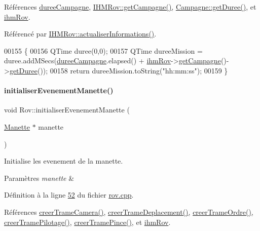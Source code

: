 Références \hyperlink{rov_8h_source_l00109}{duree\+Campagne}, \hyperlink{ihmrov_8cpp_source_l00149}{I\+H\+M\+Rov\+::get\+Campagne()}, \hyperlink{campagne_8cpp_source_l00044}{Campagne\+::get\+Duree()}, et \hyperlink{rov_8h_source_l00094}{ihm\+Rov}.



Référencé par \hyperlink{ihmrov_8cpp_source_l00110}{I\+H\+M\+Rov\+::actualiser\+Informations()}.


\begin{DoxyCode}
00155 \{
00156     QTime duree(0,0);
00157     QTime dureeMission = duree.addMSecs(\hyperlink{class_rov_a148a0ff28fc2dbed7b65466d77297b8a}{dureeCampagne}.elapsed() + 
      \hyperlink{class_rov_a9b1c1c3b4e268a32e69b2ea4c863b817}{ihmRov}->\hyperlink{class_i_h_m_rov_ab3e8686eef9233b4c1e6711cf1c4576a}{getCampagne}()->\hyperlink{class_campagne_abe02a9050f4a5ea9521dd40b855c350b}{getDuree}());
00158     \textcolor{keywordflow}{return} dureeMission.toString(\textcolor{stringliteral}{"hh:mm:ss"});
00159 \}
\end{DoxyCode}
\mbox{\label{class_rov_a0d1863d7d230c0153253d7d2689429b5}} 
\paragraph{\texorpdfstring{initialiser\+Evenement\+Manette()}{initialiserEvenementManette()}}
{\footnotesize\ttfamily void Rov\+::initialiser\+Evenement\+Manette (\begin{DoxyParamCaption}\item[{\hyperlink{class_manette}{Manette} $\ast$}]{manette }\end{DoxyParamCaption})\hspace{0.3cm}{\ttfamily [private]}}



Initialise les evenement de la manette. 


\begin{DoxyParams}{Paramètres}
{\em manette} & \\
\hline
\end{DoxyParams}


Définition à la ligne \hyperlink{rov_8cpp_source_l00052}{52} du fichier \hyperlink{rov_8cpp_source}{rov.\+cpp}.



Références \hyperlink{rov_8cpp_source_l00251}{creer\+Trame\+Camera()}, \hyperlink{rov_8cpp_source_l00208}{creer\+Trame\+Deplacement()}, \hyperlink{rov_8cpp_source_l00230}{creer\+Trame\+Ordre()}, \hyperlink{rov_8cpp_source_l00219}{creer\+Trame\+Pilotage()}, \hyperlink{rov_8cpp_source_l00240}{creer\+Trame\+Pince()}, et \hyperlink{rov_8h_source_l00094}{ihm\+Rov}.



